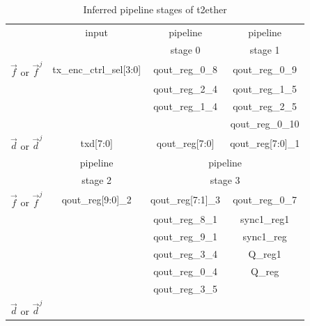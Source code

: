\documentclass[conference]{IEEEtran}
\begin{document}
\begin{table}[t]
\centering
\caption{Inferred pipeline stages of t2ether}
\begin{tabular}{|c|c|c|c|}
\hline
                       & input                        & pipeline                  &  pipeline          \\
                       &                              & stage 0                   &  stage 1           \\\hline\hline
$\vec{f}$ or $\vec{f}^j$& tx\_enc\_ctrl\_sel[3:0]     &qout\_reg\_0\_8            & qout\_reg\_0\_9    \\
                       &                              &qout\_reg\_2\_4            & qout\_reg\_1\_5    \\
                       &                              &qout\_reg\_1\_4            & qout\_reg\_2\_5    \\
                       &                              &                           & qout\_reg\_0\_10   \\\hline
$\vec{d}$ or $\vec{d}^j$&txd[7:0]                     &qout\_reg[7:0]             &qout\_reg[7:0]\_1   \\\hline\hline
                       &  pipeline                    &  \multicolumn{2}{|c|}{pipeline}                \\
                       &  stage 2                     &  \multicolumn{2}{|c|}{stage 3}                 \\\hline\hline
$\vec{f}$ or $\vec{f}^j$&qout\_reg[9:0]\_2            &qout\_reg[7:1]\_3 &qout\_reg\_0\_7              \\
                       &                              &qout\_reg\_8\_1   &sync1\_reg1                  \\
                       &                              &qout\_reg\_9\_1   &sync1\_reg                   \\
                       &                              &qout\_reg\_3\_4   &Q\_reg1                      \\
                       &                              &qout\_reg\_0\_4   &Q\_reg                       \\
                       &                              &qout\_reg\_3\_5   &                             \\\hline
$\vec{d}$ or $\vec{d}^j$&                             &\multicolumn{2}{|c|}{}                          \\\hline
\end{tabular}\label{tab_t2ether}
\end{table}
\end{document}

